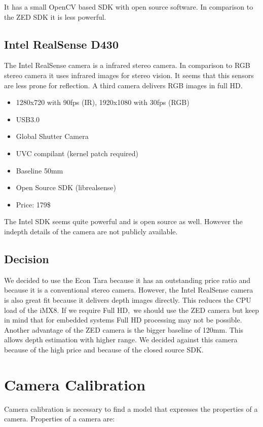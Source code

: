 \documentclass[11pt,a4paper,titlepage,oneside]{report}
\begin{document}
It has a small OpenCV based SDK with open source software. In comparison to the ZED SDK it is less powerful.

\section{Intel RealSense D430}
The Intel RealSense camera is a infrared stereo camera. In comparison to RGB stereo camera it uses infrared images for stereo vision. It seems that this sensors are less prone for reflection. A third camera delivers RGB images in full HD.
\begin{itemize}
	\item 1280x720 with 90fps (IR), 1920x1080 with 30fps (RGB)
	\item USB3.0
	\item Global Shutter Camera
	\item UVC compilant (kernel patch required)
	\item Baseline 50mm
	\item Open Source SDK (librealsense)
	\item Price: 179\$
\end{itemize}

The Intel SDK seems quite powerful and is open source as well. However the indepth details of the camera are not publicly available.

\section{Decision}

We decided to use the Econ Tara because it has an outstanding price ratio and because it is a conventional stereo camera. However, the Intel RealSense camera is also great fit because it delivers depth images directly. This reduces the CPU load of the iMX8. If we require Full HD, we should use the ZED camera but keep in mind that for embedded systems Full HD processing may not be possible. Another advantage of the ZED camera is the bigger baseline of 120mm. This allows depth estimation with higher range. We decided against this camera because of the high price and because of the closed source SDK.

\chapter{Camera Calibration}

Camera calibration is necessary to find a model that expresses the properties of a camera. Properties of a camera are:
\end{document}
